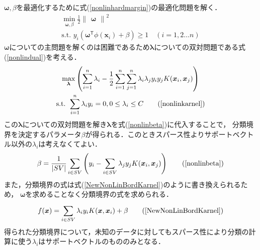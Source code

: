 \documentclass[11pt,a4paper,titlepage]{ltjsarticle}
\begin{document}
$\bm{\omega},\beta$を最適化するために式(\ref{nonlinhardmargin})の最適化問題を解く．
\begin{equation}
    \label{nonlinhardmargin}
    \begin{gathered}
        \min_{\bm{\omega},\beta}\frac{1}{2}\begin{Vmatrix}\bm{\omega}\end{Vmatrix}^2\\
        \text{s.t. } y_i(\bm{\omega}^\mathsf{T}\phi(\bm{x}_i) + \beta) \geq 1 \quad (i=1,2\dots n) 
    \end{gathered}
\end{equation}
$\bm{\omega}$についての主問題を解くのは困難であるため$\bm{\lambda}$についての双対問題である式(\ref{nonlindual})を考える．
\begin{equation}
    \begin{gathered}
        \max_{\bm{\lambda}}\left(\sum_{i=1}^{n}\lambda_i-\frac{1}{2}\sum_{i=1}^{n}\sum_{j=1}^{n}\lambda_i\lambda_jy_iy_jK(\bm{x}_i,\bm{x}_j)\right)\\
        \text{s.t. }\sum_{i=1}^{n}\lambda_iy_i=0,0\leq\lambda_i\leq C \tag{\ref{nonlinkarnel}}
    \end{gathered}
\end{equation}
この$\bm{\lambda}$についての双対問題を解き$\bm{\lambda}$を式(\ref{nonlinbeta})に代入することで，
分類境界を決定するパラメータ$\beta$が得られる．このときスパース性よりサポートベクトル以外の$\lambda_i$は考えなくてよい．
\begin{equation}
    \beta = \frac{1}{|SV|}\sum_{i \in SV}\left(y_i - \sum_{i \in SV}\lambda_jy_jK(\bm{x}_i,\bm{x}_j)\right) \tag{\ref{nonlinbeta}}
\end{equation}
また，分類境界の式は式(\ref{NewNonLinBordKarnel})のように書き換えられるため，
$\bm{\omega}$を求めることなく分類境界の式を求められる．
\begin{equation}
    f(\bm{x}) = \sum_{i \in SV}^{}\lambda_iy_iK(\bm{x},\bm{x}_i) + \beta \tag{\ref{NewNonLinBordKarnel}}
\end{equation}
得られた分類境界について，未知のデータに対してもスパース性により分類の計算に使う$\lambda_i$はサポートベクトルのもののみとなる．
%
%
\printbibliography
\end{document}
